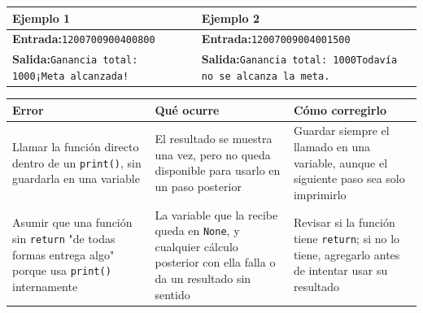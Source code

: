 \documentclass[11pt]{article}
\begin{document}
\begin{estrategiabox}
\vspace{1mm}
\noindent\begin{tabularx}{\linewidth}{|X|X|}
\hline
\textbf{Ejemplo 1} & \textbf{Ejemplo 2} \\
\hline
\textbf{Entrada:}\newline \texttt{1200}\newline \texttt{700}\newline \texttt{900}\newline \texttt{400}\newline \texttt{800} & \textbf{Entrada:}\newline \texttt{1200}\newline \texttt{700}\newline \texttt{900}\newline \texttt{400}\newline \texttt{1500} \\
\hline
\textbf{Salida:}\newline \texttt{Ganancia total: 1000}\newline \texttt{¡Meta alcanzada!} & \textbf{Salida:}\newline \texttt{Ganancia total: 1000}\newline \texttt{Todavía no se alcanza la meta.} \\
\hline
\end{tabularx}
\end{estrategiabox}

\begin{alertabox}
\noindent\begin{tabularx}{\linewidth}{|X|X|X|}
\hline
\textbf{Error} & \textbf{Qué ocurre} & \textbf{Cómo corregirlo} \\
\hline
Llamar la función directo dentro de un \texttt{print()}, sin guardarla en una variable & El resultado se muestra una vez, pero no queda disponible para usarlo en un paso posterior & Guardar siempre el llamado en una variable, aunque el siguiente paso sea solo imprimirlo \\
\hline
Asumir que una función sin \texttt{return} "de todas formas entrega algo" porque usa \texttt{print()} internamente & La variable que la recibe queda en \texttt{None}, y cualquier cálculo posterior con ella falla o da un resultado sin sentido & Revisar si la función tiene \texttt{return}; si no lo tiene, agregarlo antes de intentar usar su resultado \\
\hline
\end{tabularx}
\end{alertabox}
\end{document}
